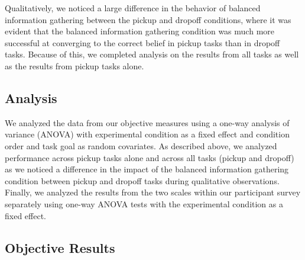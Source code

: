 \documentclass[conference]{IEEEtran}
\begin{document}
Qualitatively, we noticed a large difference in the behavior of balanced information gathering between the pickup and dropoff conditions, where it was evident that the balanced information gathering condition was much more successful at converging to the correct belief in pickup tasks than in dropoff tasks. Because of this, we completed analysis on the results from all tasks as well as the results from pickup tasks alone.

\subsection{Analysis}

We analyzed the data from our objective measures using a one-way analysis of variance (ANOVA) with experimental condition as a fixed effect and condition order and task goal as random covariates. As described above, we analyzed performance across pickup tasks alone and across all tasks (pickup and dropoff) as we noticed a difference in the impact of the balanced information gathering condition between pickup and dropoff tasks during qualitative observations. Finally, we analyzed the results from the two scales within our participant survey separately using one-way ANOVA tests with the experimental condition as a fixed effect.

\subsection{Objective Results}
\end{document}
